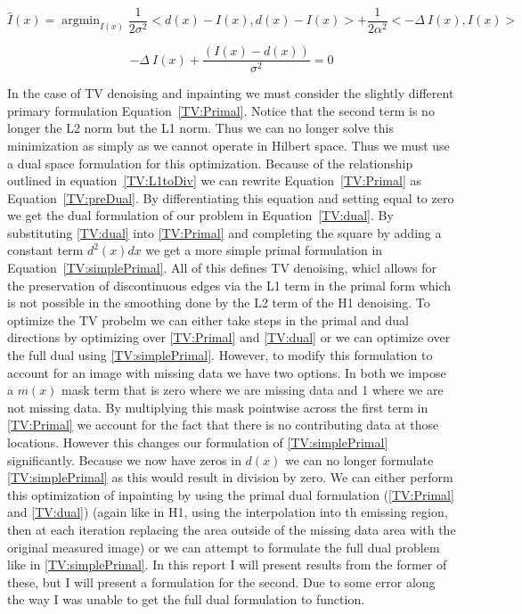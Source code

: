 \documentclass[12pt]{article}
\DeclareMathOperator*{\argmin}{argmin}
\begin{document}
\begin{equation}
\hat{I}(x) = \argmin_{I(x)} \frac{1}{2\sigma^2}<d(x)-I(x),d(x)-I(x)> + \frac{1}{2\alpha^2}<-\Delta~I(x),I(x)>
\label{EQ:H1_2}
\end{equation}

\begin{equation}
-\Delta~I(x) + \frac{(I(x)-d(x))}{\sigma^2} = 0
\label{EQ:H1_3}
\end{equation}

\par{}
In the case of TV denoising and inpainting we must consider the slightly different primary formulation Equation~\ref{TV:Primal}. Notice that the second term is no longer the L2 norm but the L1 norm. Thus we can no longer solve this minimization as simply as we cannot operate in Hilbert space. Thus we must use a dual space formulation for this optimization. Because of the relationship outlined in equation~\ref{TV:L1toDiv} we can rewrite Equation~\ref{TV:Primal} as Equation~\ref{TV:preDual}. By differentiating this equation and setting equal to zero we get the dual formulation of our problem in Equation~\ref{TV:dual}. By substituting \ref{TV:dual} into \ref{TV:Primal} and completing the square by adding a constant term $d^2(x)dx$ we get a more simple primal formulation in Equation~\ref{TV:simplePrimal}. All of this defines TV denoising, whicl allows for the preservation of discontinuous edges via the L1 term in the primal form which is not possible in the smoothing done by the L2 term of the H1 denoising. To optimize the TV probelm we can either take steps in the primal and dual directions by optimizing over \ref{TV:Primal} and \ref{TV:dual} or we can optimize over the full dual using \ref{TV:simplePrimal}. However, to modify this formulation to account for an image with missing data we have two options. In both we impose a $m(x)$ mask term that is zero where we are missing data and 1 where we are not missing data. By multiplying this mask pointwise across the first term in \ref{TV:Primal} we account for the fact that there is no contributing data at those locations. However this changes our formulation of \ref{TV:simplePrimal} significantly. Because we now have zeros in $d(x)$ we can no longer formulate \ref{TV:simplePrimal} as this would result in division by zero. We can either perform this optimization of inpainting by using the primal dual formulation (\ref{TV:Primal} and \ref{TV:dual}) (again like in H1, using the interpolation into th emissing region, then at each iteration replacing the area outside of the missing data area with the original measured image) or we can attempt to formulate the full dual problem like in \ref{TV:simplePrimal}. In this report I will present results from the former of these, but I will present a formulation for the second. Due to some error along the way I was unable to get the full dual formulation to function.
\end{document}
